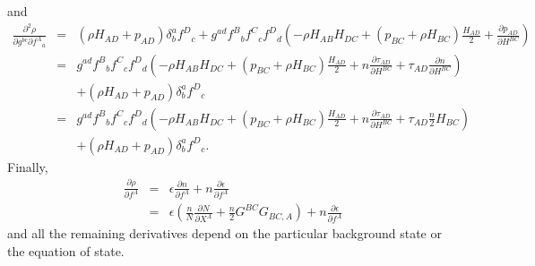 and 
\begin{eqnarray}
\frac{\partial^2 \rho}{\partial g^{bc} \partial f^A{}_a } & = & \left( \rho H_{AD} + p_{AD} \right)\delta^a_bf^D{}_c + g^{ad}f^B{}_bf^C{}_cf^{D}{}_d \left( -\rho H_{AB}H_{DC}   + \left(p_{BC} + \rho H_{BC} \right)\frac{H_{AD}}{2} + \frac{\partial p_{AD}}{\partial H^{BC} } \right) \\
 \nonumber & = & g^{ad}f^B{}_bf^C{}_cf^{D}{}_d \left( -\rho H_{AB}H_{DC}   + \left(p_{BC} + \rho H_{BC} \right)\frac{H_{AD}}{2} + n\frac{\partial \tau_{AD}}{\partial H^{BC} } + \tau_{AD}\frac{\partial n}{\partial H^{BC} } \right) \\
 && + \left( \rho H_{AD} + p_{AD} \right)\delta^a_bf^D{}_c \\
 \nonumber & = & g^{ad}f^B{}_bf^C{}_cf^{D}{}_d \left( -\rho H_{AB}H_{DC}   + \left(p_{BC} + \rho H_{BC} \right)\frac{H_{AD}}{2} + n\frac{\partial \tau_{AD}}{\partial H^{BC} } + \tau_{AD}\frac{n}{2} H_{BC} \right) \\
 && + \left( \rho H_{AD} + p_{AD} \right)\delta^a_bf^D{}_c.
\end{eqnarray}
Finally,
\begin{eqnarray}
\frac{\partial \rho}{\partial f^A} & = & \epsilon\frac{\partial n}{\partial f^A} + n\frac{\partial \epsilon}{\partial f^A} \\
 & = & \epsilon\left(\frac{n}{N}\frac{\partial N}{\partial X^A} + \frac{n}{2}G^{BC}G_{BC,A}\right) + n\frac{\partial \epsilon}{\partial f^A}
\end{eqnarray}
and all the remaining derivatives depend on the particular background state or the equation of state.

